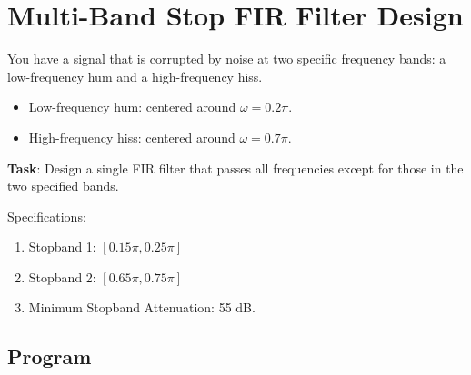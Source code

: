 \section{Multi-Band Stop FIR Filter Design}
You have a signal that is corrupted by noise at two specific frequency bands: a low-frequency hum and a high-frequency hiss.
\begin{itemize}
	\item Low-frequency hum: centered around $\omega=0.2\pi$.
	\item High-frequency hiss: centered around $\omega=0.7\pi$.
\end{itemize}
\textbf{Task}: Design a single FIR filter that passes all frequencies except for those in the two specified bands.

Specifications:
\begin{enumerate}
	\item Stopband 1: $[0.15\pi, 0.25\pi]$
	\item Stopband 2: $[0.65\pi, 0.75\pi]$
	\item Minimum Stopband Attenuation: 55 dB.
\end{enumerate}

\subsection*{Program}


\begin{figure*}[ht!]
\end{figure*}